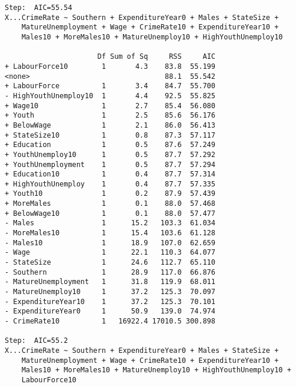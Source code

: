\documentclass[11pt]{article}
\begin{document}
\begin{enumerate}
\begin{verbatim}
Step:  AIC=55.54
X...CrimeRate ~ Southern + ExpenditureYear0 + Males + StateSize + 
    MatureUnemployment + Wage + CrimeRate10 + ExpenditureYear10 + 
    Males10 + MoreMales10 + MatureUnemploy10 + HighYouthUnemploy10

                      Df Sum of Sq     RSS     AIC
+ LabourForce10        1       4.3    83.8  55.199
<none>                                88.1  55.542
+ LabourForce          1       3.4    84.7  55.700
- HighYouthUnemploy10  1       4.4    92.5  55.825
+ Wage10               1       2.7    85.4  56.080
+ Youth                1       2.5    85.6  56.176
+ BelowWage            1       2.1    86.0  56.413
+ StateSize10          1       0.8    87.3  57.117
+ Education            1       0.5    87.6  57.249
+ YouthUnemploy10      1       0.5    87.7  57.292
+ YouthUnemployment    1       0.5    87.7  57.294
+ Education10          1       0.4    87.7  57.314
+ HighYouthUnemploy    1       0.4    87.7  57.335
+ Youth10              1       0.2    87.9  57.439
+ MoreMales            1       0.1    88.0  57.468
+ BelowWage10          1       0.1    88.0  57.477
- Males                1      15.2   103.3  61.034
- MoreMales10          1      15.4   103.6  61.128
- Males10              1      18.9   107.0  62.659
- Wage                 1      22.1   110.3  64.077
- StateSize            1      24.6   112.7  65.110
- Southern             1      28.9   117.0  66.876
- MatureUnemployment   1      31.8   119.9  68.011
- MatureUnemploy10     1      37.2   125.3  70.097
- ExpenditureYear10    1      37.2   125.3  70.101
- ExpenditureYear0     1      50.9   139.0  74.974
- CrimeRate10          1   16922.4 17010.5 300.898

Step:  AIC=55.2
X...CrimeRate ~ Southern + ExpenditureYear0 + Males + StateSize + 
    MatureUnemployment + Wage + CrimeRate10 + ExpenditureYear10 + 
    Males10 + MoreMales10 + MatureUnemploy10 + HighYouthUnemploy10 + 
    LabourForce10


\end{verbatim}
\end{enumerate}
\end{document}
